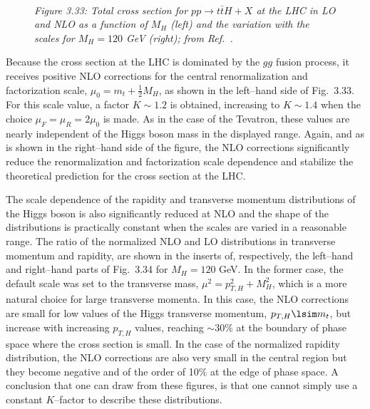 \begin{figure}[!h]
\begin{center}
\hspace*{-5mm}
\mbox{
\hspace*{-2mm}
 }
\end{center}
\vspace*{-.2cm}
{\it Figure 3.33: Total cross section for $p p\to t\bar{t}H + X$
at the LHC in LO and NLO as a function of $M_H$ (left) and the variation 
with the scales for $M_H=120$ GeV (right); from Ref.~\cite{Htt-NLO-DESY}.}
\vspace*{-.3cm}
\end{figure}

Because the cross section at the LHC is dominated by the $gg$ fusion process,
it receives positive NLO corrections for the central renormalization and
factorization scale, $\mu_0=m_t+ \frac{1}{2}M_H$, as shown in the left--hand
side of Fig.~3.33. For this scale value, a factor $K \sim 1.2$ is obtained,
increasing to $K \sim 1.4$ when the choice $\mu_F=\mu_R=2\mu_0$ is made. As in
the case of the Tevatron, these values are nearly independent of the Higgs
boson mass in the displayed range. Again, and as is shown in the right--hand
side of the figure, the NLO corrections significantly reduce the
renormalization and factorization scale dependence and stabilize the
theoretical prediction for the cross section at the LHC. \s

The scale dependence of the rapidity and transverse momentum distributions of 
the Higgs boson is also significantly reduced at NLO and the shape of the 
distributions is practically constant when the scales are varied in a 
reasonable range. The ratio of the normalized NLO and LO distributions in
transverse momentum and rapidity, are shown in the inserts of, respectively, 
the left--hand and right--hand parts of Fig.~3.34 for $M_H=120$ GeV. In the 
former case, the default scale was set to the transverse mass, $\mu^2=p_{T,H}^2 
+ M_H^2$, which is a more natural choice for large transverse momenta. 
In this case, the NLO corrections are small for low values of the  Higgs 
transverse momentum, $p_{T,H} \lsim m_t$, but increase with increasing
$p_{T,H}$ values, reaching $\sim 30\%$ at the boundary of phase space where
the cross section is small. In the case of the normalized rapidity 
distribution, the NLO corrections are also very small in the central region
but they become negative and of the order of 10\% at the edge of phase space. 
A conclusion that one can draw from these figures, is that one cannot simply 
use a constant $K$--factor to describe these distributions. \s

